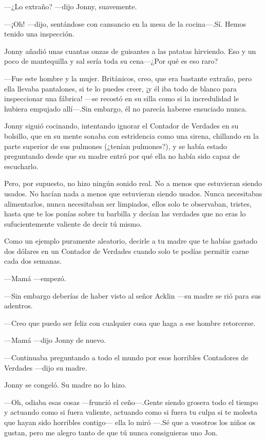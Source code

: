 ---¿Lo extraño? ---dijo Jonny, suavemente.

---¡Oh! ---dijo, sentándose con cansancio en la mesa de la cocina---.Sí.
Hemos tenido una inspección.

Jonny añadió unas cuantas onzas de guisantes a las patatas hirviendo.
Eso y un poco de mantequilla y sal sería toda su cena---¿Por qué es eso
raro?

---Fue este hombre y la mujer. Británicos, creo, que era bastante
extraño, pero ella llevaba pantalones, si te lo puedes creer, ¡y él iba
todo de blanco para inspeccionar una fábrica! ---se recostó en su silla
como si la incredulidad le hubiera empujado allí---.Sin embargo, él no
parecía haberse ensuciado nunca.

Jonny siguió cocinando, intentando ignorar el Contador de Verdades en su
bolsillo, que en su mente sonaba con estridencia como una sirena,
chillando en la parte superior de sus pulmones (¿tenían pulmones?), y se
había estado preguntando desde que su madre entró por qué ella no había
sido capaz de escucharlo.

Pero, por supuesto, no hizo ningún sonido real. No a menos que
estuvieran siendo usados. No hacían nada a menos que estuvieran siendo
usados. Nunca necesitabas alimentarlos, nunca necesitaban ser limpiados,
ellos solo te observaban, tristes, hasta que te los ponías sobre tu
barbilla y decían las verdades que no eras lo sufucientemente valiente
de decir tú mismo.

Como un ejemplo puramente aleatorio, decirle a tu madre que te habías
gastado dos dólares en un Contador de Verdades cuando solo te podías
permitir carne cada dos semanas.

---Mamá ---empezó.

---Sin embargo deberías de haber visto al señor Acklin ---su madre se
rió para sus adentros.

---Creo que puedo ser feliz con cualquier cosa que haga a ese hombre
retorcerse.

---Mamá ---dijo Jonny de nuevo.

---Continuaba preguntando a todo el mundo por esos horribles Contadores
de Verdades ---dijo su madre.

Jonny se congeló. Su madre no lo hizo.

---Oh, odiaba esas cosas ---frunció el ceño---.Gente siendo grosera todo
el tiempo y actuando como si fuera valiente, actuando como si fuera tu
culpa si te molesta que hayan sido horribles contigo--- ella lo miró
---.Sé que a vosotros los niños os gustan, pero me alegro tanto de que
tú nunca consiguieras uno Jon.

